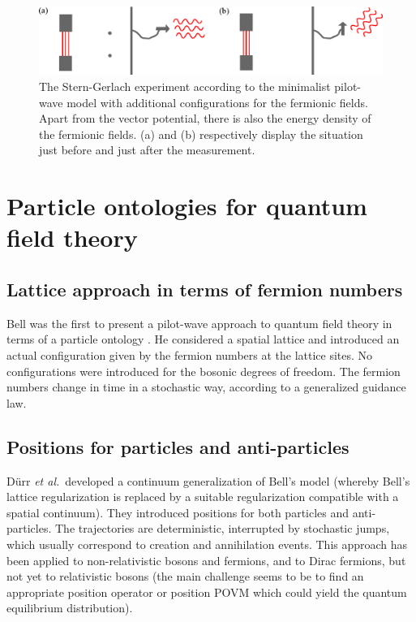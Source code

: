 \documentclass[12pt]{article}
\begin{document}
\begin{figure}
\begin{center}
\includegraphics[width=\textwidth]{minimalistplus.eps}
\end{center}
\caption{\label{minimalistplus}The Stern-Gerlach experiment according to the minimalist pilot-wave model with additional configurations for the fermionic fields. Apart from the vector potential, there is also the energy density of the fermionic fields. (a) and (b) respectively display the situation just before and just after the measurement.}
\end{figure}


\section{Particle ontologies for quantum field theory}\label{particles}
\subsection{Lattice approach in terms of fermion numbers}
Bell was the first to present a pilot-wave approach to quantum field theory in terms of a particle ontology \cite{bell87b}. He considered a spatial lattice and introduced an actual configuration given by the fermion numbers at the lattice sites. No configurations were introduced for the bosonic degrees of freedom. The fermion numbers change in time in a stochastic way, according to a generalized guidance law.  

\subsection{Positions for particles and anti-particles}
D\"urr {\em et al.}\  developed a continuum generalization of Bell's model \cite{durr02,durr031,durr032,durr04} (whereby Bell's lattice regularization is replaced by a suitable regularization compatible with a spatial continuum). They introduced positions for both particles and anti-particles. The trajectories are deterministic, interrupted by stochastic jumps, which usually correspond to creation and annihilation events. This approach has been applied to non-relativistic bosons and fermions, and to Dirac fermions, but not yet to relativistic bosons (the main challenge seems to be to find an appropriate position operator or position POVM which could yield the quantum equilibrium distribution).  
\end{document}

